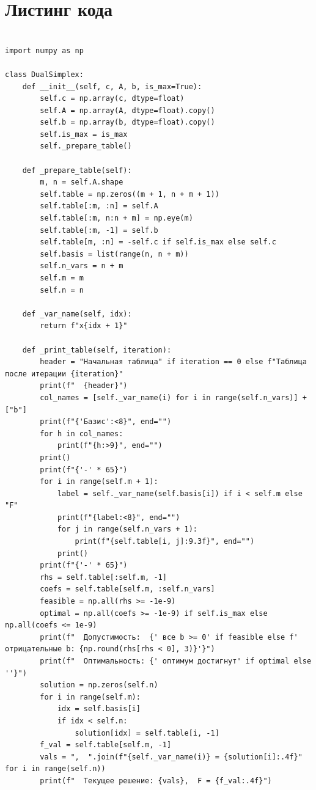 \documentclass[oneside,a4paper,14pt]{extarticle}
\begin{document}
\newpage
\section*{Листинг кода}

\begin{verbatim}

import numpy as np

class DualSimplex:
    def __init__(self, c, A, b, is_max=True):
        self.c = np.array(c, dtype=float)
        self.A = np.array(A, dtype=float).copy()
        self.b = np.array(b, dtype=float).copy()
        self.is_max = is_max
        self._prepare_table()

    def _prepare_table(self):
        m, n = self.A.shape
        self.table = np.zeros((m + 1, n + m + 1))
        self.table[:m, :n] = self.A
        self.table[:m, n:n + m] = np.eye(m)
        self.table[:m, -1] = self.b
        self.table[m, :n] = -self.c if self.is_max else self.c
        self.basis = list(range(n, n + m))
        self.n_vars = n + m
        self.m = m
        self.n = n

    def _var_name(self, idx):
        return f"x{idx + 1}"

    def _print_table(self, iteration):
        header = "Начальная таблица" if iteration == 0 else f"Таблица после итерации {iteration}"
        print(f"  {header}")
        col_names = [self._var_name(i) for i in range(self.n_vars)] + ["b"]
        print(f"{'Базис':<8}", end="")
        for h in col_names:
            print(f"{h:>9}", end="")
        print()
        print(f"{'-' * 65}")
        for i in range(self.m + 1):
            label = self._var_name(self.basis[i]) if i < self.m else "F"
            print(f"{label:<8}", end="")
            for j in range(self.n_vars + 1):
                print(f"{self.table[i, j]:9.3f}", end="")
            print()
        print(f"{'-' * 65}")
        rhs = self.table[:self.m, -1]
        coefs = self.table[self.m, :self.n_vars]
        feasible = np.all(rhs >= -1e-9)
        optimal = np.all(coefs >= -1e-9) if self.is_max else np.all(coefs <= 1e-9)
        print(f"  Допустимость:  {' все b >= 0' if feasible else f' отрицательные b: {np.round(rhs[rhs < 0], 3)}'}")
        print(f"  Оптимальность: {' оптимум достигнут' if optimal else ''}")
        solution = np.zeros(self.n)
        for i in range(self.m):
            idx = self.basis[i]
            if idx < self.n:
                solution[idx] = self.table[i, -1]
        f_val = self.table[self.m, -1]
        vals = ",  ".join(f"{self._var_name(i)} = {solution[i]:.4f}" for i in range(self.n))
        print(f"  Текущее решение: {vals},  F = {f_val:.4f}")


\end{verbatim}
\end{document}
